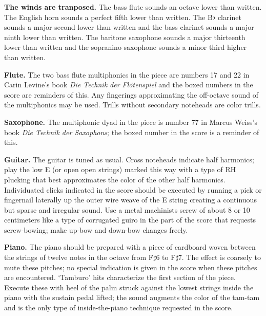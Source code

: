 \documentclass[10pt]{article}
\begin{document}
\begin{textblock}{23}
\textbf{The winds are tranposed.} The bass flute sounds an octave lower than
written. The English horn sounds a perfect fifth lower than written. The
B$\flat$ clarinet sounds a major second lower than written and the bass
clarinet sounds a major ninth lower than written. The baritone saxophone sounds
a major thirteenth lower than written and the sopranino saxophone sounds a
minor third higher than written.

\textbf{Flute.} The two bass flute multiphonics in the piece are numbers 17 and
22 in Carin Levine's book \textit{Die Technik der Flötenspiel} and the boxed
numbers in the score are reminders of this. Any fingerings approximating the
off-octave sound of the multiphonics may be used. Trills without secondary
noteheads are color trills.

\textbf{Saxophone.} The multiphonic dyad in the piece is number 77 in Marcus
Weiss's book \textit{Die Technik der Saxophons}; the boxed number in the score
is a reminder of this.

\textbf{Guitar.} The guitar is tuned as usual. Cross noteheads indicate half
harmonics; play the low E (or open open strings) marked this way with a type of
RH plucking that best approximates the color of the other half harmonics.
Individuated clicks indicated in the score should be executed by running a pick
or fingernail laterally up the outer wire weave of the E string creating a
continuous but sparse and irregular sound. Use a metal machinists screw of
about 8 or 10 centimeters like a type of corrugated guiro in the part of the
score that requests screw-bowing; make up-bow and down-bow changes freely.

\textbf{Piano.} The piano should be prepared with a piece of cardboard woven
between the strings of twelve notes in the octave from F$\sharp$6 to
F$\sharp$7. The effect is coarsely to mute these pitches; no special indication
is given in the score when these pitches are encountered. `Tamburo' hits
characterize the first section of the piece. Execute these with heel of the
palm struck against the lowest strings inside the piano with the sustain pedal
lifted; the sound augments the color of the tam-tam and is the only type of
inside-the-piano technique requested in the score.


\end{textblock}
\end{document}
